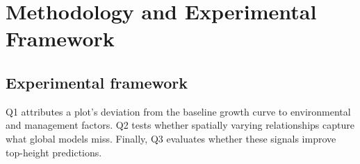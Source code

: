 %

\chapter{Methodology and Experimental Framework} \label{ch:methodology}
\section{Experimental framework}
Q1 attributes a plot's deviation from the baseline growth curve to environmental and management factors. Q2 tests whether spatially varying relationships capture what global models miss. Finally, Q3 evaluates whether these signals improve top-height predictions.

